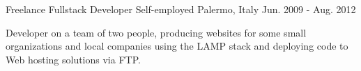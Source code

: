 \begin{cventries}
  \cventry
    {Freelance Fullstack Developer} %
    {Self-employed} %
    {Palermo, Italy} %
    {Jun. 2009 - Aug. 2012} %
    {
      \begin{cvitems} %
        \item {Developer on a team of two people, producing websites for some small organizations and local companies using the LAMP stack and deploying code to Web hosting solutions via FTP.}
      \end{cvitems}
    }

\end{cventries}
